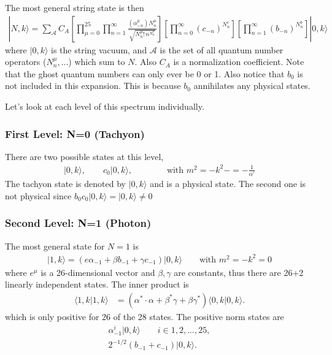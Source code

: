 \documentclass[notitlepage,amsmath,amssymb,aps, pra, 10pt]{revtex4-1}
\begin{document}
        The most general string state is then
        \begin{align}
            |N, k\rangle = \sum_{\mathcal{A}} C_A \left[ \prod_{\mu = 0}^{25} \prod_{n=1}^{\infty} \frac{(\alpha_{-n}^{\mu}) N^{\mu}_n}{\sqrt{N_n^{\mu}! \, n^{N_n^{\mu}}}} \right]
            \left[ \prod_{n=0}^{\infty} (c_{-n})^{N^c_n} \right]
            \left[ \prod_{n=1}^{\infty} (b_{-n})^{N^b_n} \right]
            |0, k \rangle
        \end{align}
        where $|0, k \rangle$ is the string vacuum, and $\mathcal{A}$ is the set of all quantum number operators ($N_{n}^{\mu}, ...$) which sum to $N$. Also $C_A$ is a normalization coefficient. Note that the ghost quantum numbers can only ever be 0 or 1. Also notice that $b_0$ is not included in this expansion. This is because $b_0$ annihilates any physical states.

        Let's look at each level of this spectrum individually.

        \subsubsection{First Level: N=0 (Tachyon)}

            There are two possible states at this level,
            \begin{align}
                |0, k\rangle, \qquad c_0|0, k\rangle, \qquad \qquad \text{with } m^2 = -k^2 -=-\frac{1}{\alpha'}
            \end{align}
            The tachyon state is denoted by $|0, k\rangle$ and is a physical state. The second one is not physical since $b_0c_0|0, k\rangle = |0, k\rangle \neq 0$

     \subsubsection{Second Level: N=1 (Photon)}

        The most general state for $N=1$ is
        \begin{align}
            |1, k\rangle = (e\alpha_{-1} + \beta b_{-1} + \gamma c_{-1}) |0, k\rangle \qquad \text{with } m^2 = -k^2 = 0
        \end{align}
        where $e^{\mu}$ is a 26-dimensional vector and $\beta, \gamma$ are constants, thus there are 26+2 linearly independent states.
        The inner product is
        \begin{align}
            \langle 1, k | 1, k\rangle &= (
            \alpha^* \cdot \alpha
            +
            \beta^*\gamma
            +
            \beta\gamma^*
            )
            \langle 0, k | 0, k\rangle.
        \end{align}
        which is only positive for 26 of the 28 states. The positive norm states are
        \begin{align}
            \alpha_{-1}^{i} | 0, k\rangle \qquad i\in{1, 2, ..., 25},\\
            2^{-1/2} ( b_{-1} + c_{-1}) | 0, k\rangle.
        \end{align}
\end{document}

